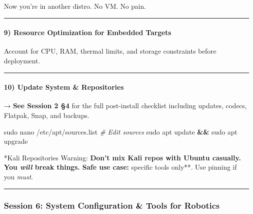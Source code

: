 \documentclass[
  english,
  paper=a4,
  oneside  ,captions=tableheading
]{scrartcl}
\newenvironment{Shaded}{}{}
\newcommand{\CommentTok}[1]{\textcolor[rgb]{0.38,0.63,0.69}{\textit{#1}}}
\newcommand{\FunctionTok}[1]{\textcolor[rgb]{0.02,0.16,0.49}{#1}}
\newcommand{\KeywordTok}[1]{\textcolor[rgb]{0.00,0.44,0.13}{\textbf{#1}}}
\newcommand{\NormalTok}[1]{#1}
\renewenvironment{quote}{\begin{customblockquote}\list{}{\rightmargin=0em\leftmargin=0em}%
\item\relax\color{blockquote-text}\ignorespaces}{\unskip\unskip\endlist\end{customblockquote}}
\begin{document}
Now you're in another distro. No VM. No pain.

\begin{center}\rule{0.5\linewidth}{0.5pt}\end{center}

\paragraph{9) Resource Optimization for Embedded
Targets}\label{resource-optimization-for-embedded-targets}

Account for CPU, RAM, thermal limits, and storage constraints before
deployment.

\begin{center}\rule{0.5\linewidth}{0.5pt}\end{center}

\paragraph{10) Update System \&
Repositories}\label{update-system-repositories}

\begin{quote}
→ \textbf{See Session 2 §4} for the full post-install checklist
including updates, codecs, Flatpak, Snap, and backups.
\end{quote}

\begin{Shaded}
\begin{Highlighting}[]
\FunctionTok{sudo}\NormalTok{ nano /etc/apt/sources.list    }\CommentTok{\# Edit sources}
\FunctionTok{sudo}\NormalTok{ apt update }\KeywordTok{\&\&} \FunctionTok{sudo}\NormalTok{ apt upgrade}
\end{Highlighting}
\end{Shaded}

\begin{quote}
\faExclamationCircle **Kali Repositories Warning:\textbf{ Don't mix Kali
repos with Ubuntu casually. You \emph{will} break things. Safe use case:
}specific tools only**. Use pinning if you \emph{must}.
\end{quote}

\begin{center}\rule{0.5\linewidth}{0.5pt}\end{center}

\subsubsection{Session 6: System Configuration \& Tools for
Robotics}\label{session-6-system-configuration-tools-for-robotics}
\end{document}
